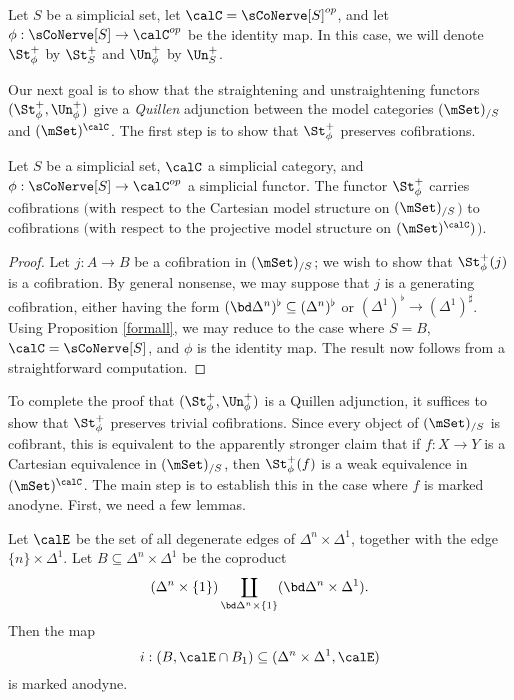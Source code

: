 \begin{notation}
Let $S$ be a simplicial set, let $\calC = \sCoNerve[S]^{op}$, and let $\phi: \sCoNerve[S] \rightarrow \calC^{op}$ be the identity map. In this case, we will denote $\St^{+}_{\phi}$ by $\St^{+}_{S}$ and $\Un^{+}_{\phi}$ by $\Un^{+}_{S}$. 
\end{notation}

Our next goal is to show that the straightening and unstraightening functors $(\St^{+}_{\phi}, \Un^{+}_{\phi})$ give a {\em Quillen} adjunction between the model categories $(\mSet)_{/S}$ and
$(\mSet)^{\calC}$. The first step is to show that $\St^{+}_{\phi}$ preserves cofibrations.

\begin{proposition}\label{cougherup}
Let $S$ be a simplicial set, $\calC$ a simplicial category, and $\phi: \sCoNerve[S] \rightarrow \calC^{op}$ a simplicial functor. The functor $\St^{+}_{\phi}$ carries cofibrations $($with respect to the Cartesian model structure on $(\mSet)_{/S}${}$)$ to cofibrations $($with respect to the projective model structure on $(\mSet)^{\calC})${}$)$.
\end{proposition}

\begin{proof}
Let $j: A \rightarrow B$ be a cofibration in $(\mSet)_{/S}$; we wish to show that
$\St^{+}_{\phi}(j)$ is a cofibration. By general nonsense, we may suppose that $j$ is a
generating cofibration, either having the form $(\bd \Delta^n)^{\flat} \subseteq (\Delta^n)^{\flat}$
or $(\Delta^1)^{\flat} \rightarrow (\Delta^1)^{\sharp}$. Using Proposition \ref{formall}, we may reduce to the case where $S=B$, $\calC = \sCoNerve[S]$, and $\phi$ is the identity map. The result now follows from a straightforward computation.
\end{proof}

To complete the proof that $(\St^{+}_{\phi}, \Un^{+}_{\phi})$ is a Quillen adjunction, it suffices to show that
$\St^{+}_{\phi}$ preserves trivial cofibrations. Since every object of $(\mSet)_{/S}$ is cofibrant, this is equivalent to the apparently stronger claim that if $f: X \rightarrow Y$ is a Cartesian equivalence
in $(\mSet)_{/S}$, then $\St^{+}_{\phi}(f)$ is a weak equivalence in $(\mSet)^{\calC}$. The main step
is to establish this in the case where $f$ is marked anodyne. First, we need a few lemmas.

\begin{lemma}\label{blurgh}
Let $\calE$ be the set of all degenerate edges of $\Delta^n \times \Delta^1$, together with the edge
$\{n\} \times \Delta^1$. Let $B \subseteq \Delta^n \times \Delta^1$ be the coproduct
$$ ( \Delta^n \times \{1\} ) \coprod_{ \bd \Delta^n \times \{1\} } (\bd \Delta^n \times \Delta^1).$$
Then the map
$$i: ( B, \calE \cap B_1 ) \subseteq ( \Delta^n \times \Delta^1, \calE)$$ is marked anodyne.
\end{lemma}

